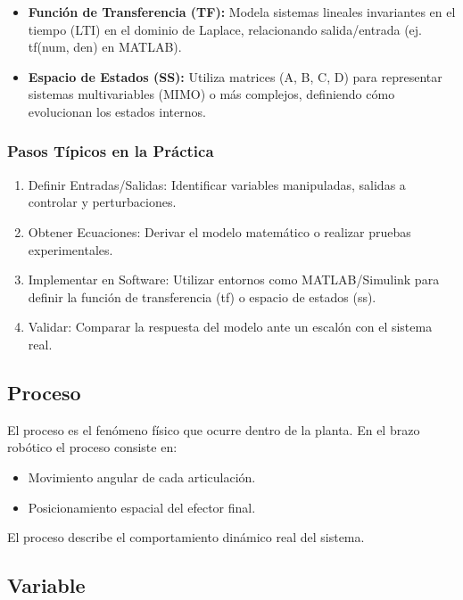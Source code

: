 \documentclass[11pt]{article}
\begin{document}
\begin{itemize}
	\item \textbf{Función de Transferencia (TF):} Modela sistemas lineales invariantes en el tiempo (LTI) en el dominio de Laplace, relacionando salida/entrada (ej. tf(num, den) en MATLAB).
	\item \textbf{Espacio de Estados (SS):} Utiliza matrices (A, B, C, D) para representar sistemas multivariables (MIMO) o más complejos, definiendo cómo evolucionan los estados internos.
\end{itemize}

\subsubsection{Pasos Típicos en la Práctica}

\begin{enumerate}
	\item Definir Entradas/Salidas: Identificar variables manipuladas, salidas a controlar y perturbaciones.
	\item Obtener Ecuaciones: Derivar el modelo matemático o realizar pruebas experimentales.
	\item Implementar en Software: Utilizar entornos como MATLAB/Simulink para definir la función de transferencia (tf) o espacio de estados (ss).
	\item Validar: Comparar la respuesta del modelo ante un escalón con el sistema real.
\end{enumerate}

\subsection{Proceso}

El proceso es el fenómeno físico que ocurre dentro de la planta. En el brazo robótico el proceso consiste en:

\begin{itemize}
	\item Movimiento angular de cada articulación.
	\item Posicionamiento espacial del efector final.
\end{itemize}

El proceso describe el comportamiento dinámico real del sistema.

\subsection{Variable}
\end{document}
